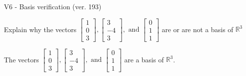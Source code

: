 \begin{exercise}
  \begin{exerciseTitle}V6 - Basis verification (ver. 193)\end{exerciseTitle}
  \begin{exerciseStatement}
    Explain why the vectors \(\left[\begin{array}{r}
1 \\
0 \\
3
\end{array}\right] , \left[\begin{array}{r}
3 \\
-4 \\
3
\end{array}\right] , \text{ and } \left[\begin{array}{r}
0 \\
1 \\
1
\end{array}\right]\) are or are not a basis of \(\mathbb{R}^3\)	


  \end{exerciseStatement}
  \begin{exerciseAnswer}
   The vectors \(\left[\begin{array}{r}
1 \\
0 \\
3
\end{array}\right] , \left[\begin{array}{r}
3 \\
-4 \\
3
\end{array}\right] , \text{ and } \left[\begin{array}{r}
0 \\
1 \\
1
\end{array}\right]\) 
  	 are  a basis of \(\mathbb{R}^3\).
  


  \end{exerciseAnswer}
\end{exercise}